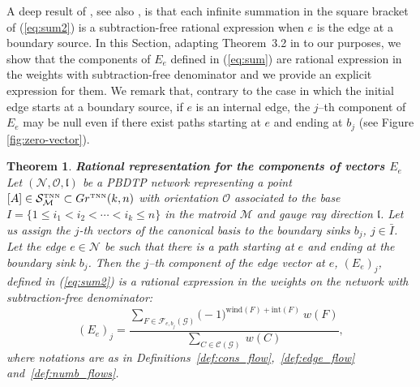 \documentclass[11pt]{amsart}
\theoremstyle{plain}
\numberwithin{equation}{section}
\newtheorem{theorem}{Theorem}[subsection]
\def \GTNN {{Gr^{\mbox{\tiny TNN}} (k,n)}}
\def \S {{\mathcal S}_{\mathcal M}^{\mbox{\tiny TNN}}}
\begin{document}
A deep result of \cite{Pos}, see also \cite{Tal2}, is that each infinite summation in the square bracket of (\ref{eq:sum2}) is a subtraction-free rational expression when $e$ is the edge at a boundary source.
In this Section, adapting Theorem~3.2 in \cite{Tal2} to our purposes, we show that the components of $E_e$ defined in (\ref{eq:sum}) are rational expression in the weights with subtraction-free denominator and we provide an explicit expression for them. We remark that, contrary to the case in which the initial edge starts at a boundary source, if $e$ is an internal edge, the $j$--th component of $E_e$ may be null even if there exist paths starting at $e$ and ending at $b_j$ (see Figure \ref{fig:zero-vector}). 

\begin{theorem}\label{theo:null}\textbf{Rational representation for the components of vectors $E_e$}
Let $({\mathcal N},\mathcal O, \mathfrak l)$ be a PBDTP network representing a point $[A]\in \S \subset \GTNN$ with orientation $\mathcal O$ associated to the base $I =\{ 1\le i_1< i_2 < \cdots < i_k\le n\}$ in the matroid $\mathcal M$ and gauge ray direction $\mathfrak{l}$. Let us assign the $j$-th vectors of the canonical basis to the boundary sinks $b_j$, $j\in \bar I$.
Let the edge $e\in {\mathcal N}$ be such that there is a path starting at $e$ and ending at the boundary sink $b_j$. Then the $j$--th component of the edge vector at $e$, $\left(E_{e}\right)_{j}$, defined in (\ref{eq:sum2}) is a rational expression in the weights on the network with subtraction-free denominator: 
\begin{equation}
\label{eq:tal_formula}
\left(E_{e}\right)_{j}= \frac{\displaystyle\sum\limits_{F\in {\mathcal F}_{e,b_j}(\mathcal G)} \big(-1\big)^{\mbox{wind}(F)+\mbox{int}(F)}\ w(F)}{\sum\limits_{C\in {\mathcal C}(\mathcal G)} \ w(C)},
\end{equation}
where notations are as in Definitions~\ref{def:cons_flow},~\ref{def:edge_flow} and~\ref{def:numb_flows}.  
\end{theorem}
\end{document}
